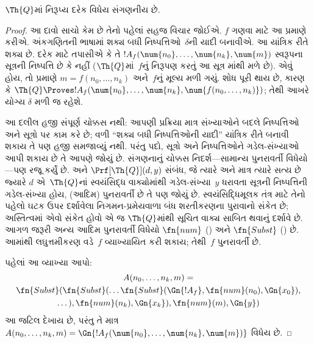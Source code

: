 \begin{lem}
$\Th{Q}$માં નિરૂપ્ય દરેક વિધેય
સંગણનીય છે.
\end{lem}

\begin{proof}
આ દાવો સાચો કેમ છે તેનો પહેલાં
સહજ વિચાર જોઈએ. $f$ ગણવા માટે
આ પ્રમાણે કરીએ. અંકગણિતની
ભાષામાં શક્ય બધી
નિષ્પત્તિઓ~$\delta$ની યાદી
બનાવીએ. આ યાંત્રિક રીતે શક્ય છે.
દરેક માટે તપાસીએ કે તે
$!A_f(\num{n_0}, \dots,
\num{n_k}, \num{m})$ સ્વરૂપના
સૂત્રની નિષ્પત્તિ
છે કે નહીં ($\Th{Q}$માં~$f$નું
નિરૂપણ કરતું આ સૂત્ર
માંથી મળે છે).
એવું હોય, તો 
પ્રમાણે $m = f(n_0, \dots, n_k)$
અને~$f$નું મૂલ્ય મળી ગયું.
શોધ પૂરી થાય છે, કારણ કે
$\Th{Q} \Proves
!A_f(\num{n_0}, \dots,
\num{n_k}, \num{f(n_0, \dots,
n_k)})$; તેથી આખરે યોગ્ય
$\delta$ મળી જ રહેશે.

આ દલીલ હજી સંપૂર્ણ ચોક્કસ નથી:
આપણી પ્રક્રિયા માત્ર સંખ્યાઓને
બદલે નિષ્પત્તિઓ અને
સૂત્રો પર કામ કરે છે;
વળી ``શક્ય બધી નિષ્પત્તિઓની
યાદી'' યાંત્રિક રીતે બનાવી
શકાય તે પણ હજી સમજાવ્યું નથી.
પરંતુ પદો, સૂત્રો અને
નિષ્પત્તિઓને ગડેલ-સંખ્યાઓ
આપી શકાય છે તે આપણે જોયું છે.
સંગણનાનું ચોક્કસ નિદર્શ—સામાન્ય
પુનરાવર્તી વિધેયો—પણ રજૂ કર્યું છે.
અને $\Prf[\Th{Q}](d,y)$ સંબંધ,
જે ત્યારે અને માત્ર ત્યારે સત્ય છે
જ્યારે $d$ એ~$\Th{Q}$નાં
સ્વયંસિદ્ધ વાક્યોમાંથી ગડેલ-સંખ્યા~$y$
ધરાવતા સૂત્રની
નિષ્પત્તિની ગડેલ-સંખ્યા
હોય, (આદિમ) પુનરાવર્તી છે તે પણ
જોયું છે. સ્વયંસિદ્ધિમૂલક તંત્ર માટે તેનો પહેલો ઘટક
ઉપર દર્શાવેલા નિગમન-પ્રમેયવાળા બંધ શરતીકરણના
પુરાવાનો સંકેત છે; અસ્તિત્વમાં એવો સંકેત હોવો એ જ
$\Th{Q}$માંથી સૂચિત વાક્ય સાબિત થવાનું દર્શાવે છે.
આગળ જરૂરી અન્ય આદિમ
પુનરાવર્તી વિધેયો $\fn{num}$
()
અને $\fn{Subst}$
() છે.
આમાંથી લઘુત્તમીકરણ વડે~$f$
વ્યાખ્યાયિત કરી શકાય; તેથી~$f$
પુનરાવર્તી છે.

પહેલાં આ વ્યાખ્યા આપો:
\begin{multline*}
  A(n_0, \dots, n_k, m) = \\
  \fn{Subst}(\fn{Subst}(\dots\fn{Subst}(\Gn{!A_f}, \fn{num}(n_0), \Gn{x_0}),\\ \dots),
  \fn{num}(n_k),  \Gn{x_k}), \fn{num}(m), \Gn{y})
\end{multline*}
આ જટિલ દેખાય છે, પરંતુ તે માત્ર
$A(n_0, \dots, n_k,
m) = \Gn{!A_f(\num{n_0}, \dots,
\num{n_k}, \num{m})}$ વિધેય છે.


\end{proof}

